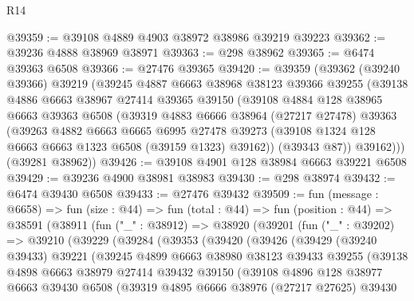 \begin{lexlean}{R14}
\begin{coremodule}
@39359 := @39108 @4889 @4903 @38972 @38986 @39219 @39223
@39362 := @39236 @4888 @38969 @38971
@39363 := @298 @38962
@39365 := @6474 @39363 @6508
@39366 := @27476 @39365
@39420 := @39359
    (@39362
      (@39240 @39366)
      @39219
      (@39245
        @4887
        @6663
        @38968
        @38123
        @39366
        @39255
        (@39138
          @4886
          @6663
          @38967
          @27414
          @39365
          @39150
          (@39108
            @4884
            @128
            @38965
            @6663
            @39363
            @6508
            (@39319
              @4883
              @6666
              @38964
              (@27217 @27478)
              @39363
              (@39263
                @4882
                @6663
                @6665
                @6995
                @27478
                @39273
                (@39108 @1324 @128 @6663 @6663 @1323 @6508 (@39159 @1323) @39162))
              (@39343 @87))
            @39162)))
      (@39281 @38962))
@39426 := @39108 @4901 @128 @38984 @6663 @39221 @6508
@39429 := @39236 @4900 @38981 @38983
@39430 := @298 @38974
@39432 := @6474 @39430 @6508
@39433 := @27476 @39432
@39509 := fun (message : @6658) =>
  fun (size : @44) =>
  fun (total : @44) =>
  fun (position : @44) =>
  @38591
    (@38911
      (fun ("_" : @38912) =>
      @38920
        (@39201
          (fun ("_" : @39202) =>
          @39210
            (@39229
              (@39284
                (@39353
                  (@39420
                    (@39426
                      (@39429
                        (@39240 @39433)
                        @39221
                        (@39245
                          @4899
                          @6663
                          @38980
                          @38123
                          @39433
                          @39255
                          (@39138
                            @4898
                            @6663
                            @38979
                            @27414
                            @39432
                            @39150
                            (@39108
                              @4896
                              @128
                              @38977
                              @6663
                              @39430
                              @6508
                              (@39319
                                @4895
                                @6666
                                @38976
                                (@27217 @27625)
                                @39430

\end{coremodule}
\end{lexlean}
